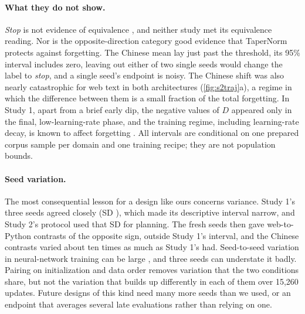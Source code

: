 \documentclass[11pt]{article}
\begin{document}
\paragraph{What they do not show.} \emph{Stop} is not evidence of equivalence \citep{lakens2017equivalence}, and
neither study met its equivalence reading. Nor is the opposite-direction category good evidence that TaperNorm
protects against forgetting. The Chinese mean lay just past the threshold, its 95\% interval includes zero,
leaving out either of two single seeds would change the label to \emph{stop}, and a single seed's endpoint is
noisy. The Chinese shift was also nearly
catastrophic for web text in both architectures (\cref{fig:s2traj}a), a regime in which the difference between
them is a small fraction of the total forgetting. In Study 1, apart from a brief early dip, the negative values of
$D$ appeared only in the final, low-learning-rate phase, and the training regime, including learning-rate decay,
is known to affect forgetting \citep{mirzadeh2020training}. All intervals are conditional on one prepared corpus
sample per domain and one training recipe; they are not population bounds.

\paragraph{Seed variation.} The most consequential lesson for a design like ours concerns variance. Study 1's
three seeds agreed closely (SD \Dsd), which made its descriptive interval narrow, and Study 2's protocol used that
SD for planning. The fresh seeds then gave web-to-Python contrasts of the opposite sign, outside Study 1's
interval, and the Chinese contrasts varied about ten times as much as Study 1's had. Seed-to-seed variation in
neural-network training can be large \citep{dodge2020finetuning}, and three seeds can understate it badly.
Pairing on initialization and data order removes variation that the two conditions share, but not the variation
that builds up differently in each of them over 15{,}260 updates. Future designs of this kind need many more seeds
than we used, or an endpoint that averages several late evaluations rather than relying on one.
\end{document}
